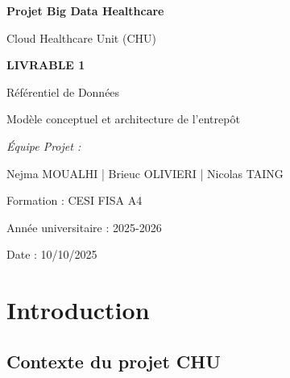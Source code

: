 \documentclass[12pt,a4paper]{article}
\begin{document}
\begin{titlepage}
    \centering
    \vspace*{2cm}
    
    {\Huge\bfseries Projet Big Data Healthcare\par}
    \vspace{0.5cm}
    {\LARGE Cloud Healthcare Unit (CHU)\par}
    \vspace{2cm}
    
    {\Huge\bfseries LIVRABLE 1\par}
    \vspace{0.5cm}
    {\Large Référentiel de Données\par}
    \vspace{0.3cm}
    {\large Modèle conceptuel et architecture de l'entrepôt\par}
    \vspace{2cm}
    
    {\large\itshape Équipe Projet :\par}
    {\large Nejma MOUALHI | Brieuc OLIVIERI | Nicolas TAING\par}
    \vspace{1cm}
    
    {\large Formation : CESI FISA A4\par}
    {\large Année universitaire : 2025-2026\par}
    \vspace{1.5cm}
    
    {\large Date : 10/10/2025\par}
    \vfill
    
    
\end{titlepage}

\tableofcontents
\newpage

\section{Introduction}

\subsection{Contexte du projet CHU}
\end{document}
